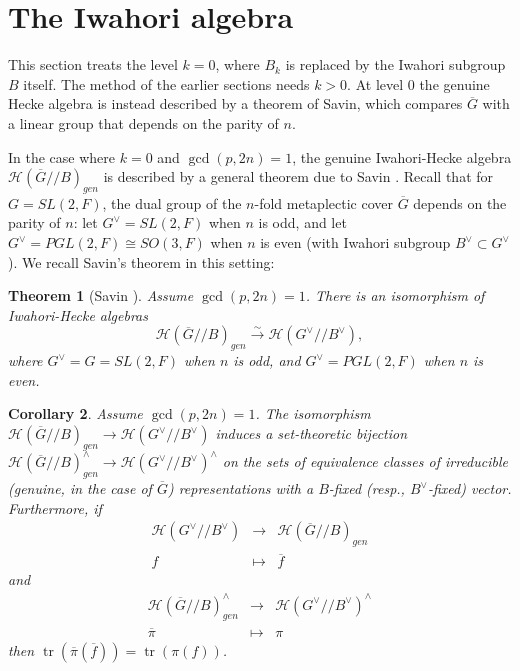 \documentclass[12pt,letterpaper,reqno]{amsart}
\let\cal\mathcal
\newtheorem{theorem}{Theorem}[section]
\newtheorem{corollary}[theorem]{Corollary}
\theoremstyle{definition}
\theoremstyle{remark}
\numberwithin{equation}{section}
\begin{document}
\section{The Iwahori algebra}
\label{section:savin}

This section treats the level $k=0$, where $B_k$ is replaced by the Iwahori
subgroup $B$ itself. The method of the earlier sections needs $k>0$. At level
$0$ the genuine Hecke algebra is instead described by a theorem of Savin, which
compares $\overline{G}$ with a linear group that depends on the parity of $n$.

In the case where $k=0$ and $\gcd(p,2n)=1$, the genuine Iwahori-Hecke algebra
${\cal H}(\overline{G}//B)_{gen}$ is described by a general theorem due to
Savin \cite{Sa88}. Recall that for $G=SL(2,F)$, the dual group of the $n$-fold
metaplectic cover $\overline{G}$ depends on the parity of $n$: let
$G^\vee=SL(2,F)$ when $n$ is odd, and let $G^\vee=PGL(2,F)\cong SO(3,F)$ when
$n$ is even (with Iwahori subgroup $B^\vee \subset G^\vee$). We recall Savin's
theorem in this setting:

\begin{theorem}[Savin \cite{Sa88}]
\label{thm:savin}
Assume $\gcd(p,2n)=1$. There is an isomorphism of Iwahori-Hecke algebras
\[
{\cal H}(\overline{G}//B)_{gen}\stackrel{\sim}{\longrightarrow}
{\cal H}(G^\vee//B^\vee),
\]
where $G^\vee=G=SL(2,F)$ when $n$ is odd, and $G^\vee=PGL(2,F)$ when $n$ is
even.
\end{theorem}

\begin{corollary}
\label{cor:20}
Assume $\gcd(p,2n)=1$. The isomorphism
${\cal H}(\overline{G}//B)_{gen}\rightarrow {\cal H}(G^\vee//B^\vee)$ induces
a set-theoretic bijection
${\cal H}(\overline{G}//B)_{gen}^\wedge
\rightarrow {\cal H}(G^\vee//B^\vee)^\wedge$ on the sets of equivalence
classes of irreducible (genuine, in the case of $\overline{G}$)
representations with a $B$-fixed (resp., $B^\vee$-fixed) vector. Furthermore,
if
\[
\begin{array}{ccc}
{\cal H}(G^\vee//B^\vee)&\longrightarrow &{\cal H}(\overline{G}//B)_{gen}\\
f & \longmapsto &\overline{f}
\end{array}
\]
and
\[
\begin{array}{ccc}
{\cal H}(\overline{G}//B)_{gen}^\wedge &\longrightarrow &{\cal H}(G^\vee//B^\vee)^\wedge\\
\overline{\pi}&\longmapsto &\pi
\end{array}
\]
then $\operatorname{tr}(\overline{\pi}(\overline{f}))=\operatorname{tr}(\pi(f))$.
\end{corollary}
\end{document}
